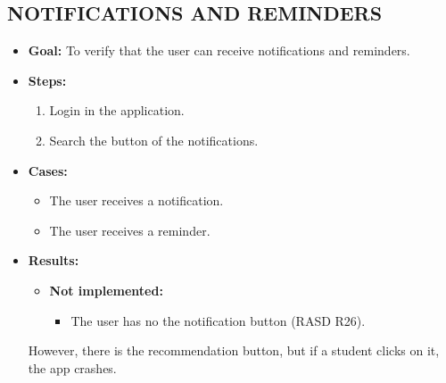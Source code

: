 \subsection{NOTIFICATIONS AND REMINDERS}\label{subsec:notifications-and-reminders}
\begin{itemize}
    \item \textbf{Goal:} To verify that the user can receive notifications and reminders.

    \item \textbf{Steps:}
    \begin{enumerate}
        \item Login in the application.
        \item Search the button of the notifications.
    \end{enumerate}
    \item \textbf{Cases:}
    \begin{itemize}
        \item The user receives a notification.
        \item The user receives a reminder.
    \end{itemize}
    \item \textbf{Results:}
    \begin{itemize}
        \item \textbf{Not implemented:}
        \begin{itemize}
            \item The user has no the notification button (RASD R26).
        \end{itemize}
    \end{itemize}

    However, there is the recommendation button, but if a student clicks on it, the app crashes.

\end{itemize}

